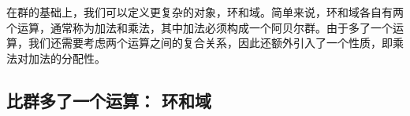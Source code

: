 
\begin{issues}
\issueDraft
{}
\end{issues}



在群的基础上，我们可以定义更复杂的对象，环和域。简单来说，环和域各自有两个运算，通常称为加法和乘法，其中加法必须构成一个阿贝尔群。由于多了一个运算，我们还需要考虑两个运算之间的复合关系，因此还额外引入了一个性质，即乘法对加法的分配性。

\subsection{比群多了一个运算： 环和域}






